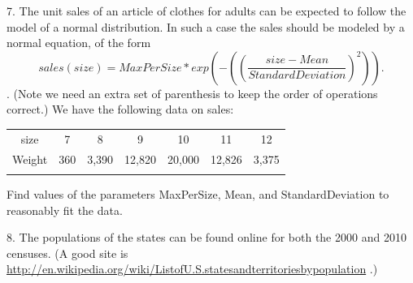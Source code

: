 \documentclass[10pt,]{book}
\theoremstyle{plain}
\theoremstyle{definition}
\theoremstyle{definition}
\newcommand{\hrulethin}  {\noalign{\hrule height 0.04em}}
\newcommand{\hrulemedium}{\noalign{\hrule height 0.07em}}
\newcommand{\hrulethick} {\noalign{\hrule height 0.11em}}
\begin{document}
\begin{exerciselist}
%
\par\smallskip
\item[7.]\hypertarget{exercise-70}{}  The unit sales of an article of clothes for adults can be expected to follow the model of a normal distribution.  In such a case the sales should be modeled by a normal equation, of the form
\begin{equation*}sales(size)=MaxPerSize*exp\left(-\left(\left(\frac{size-Mean}{StandardDeviation}\right)^2\right)\right).\end{equation*}.
(Note we need an extra set of parenthesis to keep the order of operations correct.)  We have the following data on sales:%
\leavevmode%
\begin{table}
\centering
\begin{tabular}{ccccccc}\hrulethick
size&7&8&9&10&11&12\tabularnewline\hrulethin
Weight&360&3,390&12,820&20,000&12,826&3,375\tabularnewline\hrulemedium
\end{tabular}
\end{table}
\par
Find values of the parameters MaxPerSize, Mean, and StandardDeviation to reasonably fit the data.
%
\par\smallskip
\item[8.]\hypertarget{exercise-71}{}  The populations of the states can be found online for both the 2000 and 2010 censuses.  (A good site is 
\href{http://en.wikipedia.org/wiki/List_of_U.S._states_and_territories_by_population}{http://en.wikipedia.org/wiki/List\textunderscore{}of\textunderscore{}U.S.\textunderscore{}states\textunderscore{}and\textunderscore{}territories\textunderscore{}by\textunderscore{}population}
.)


\end{exerciselist}
\end{document}
